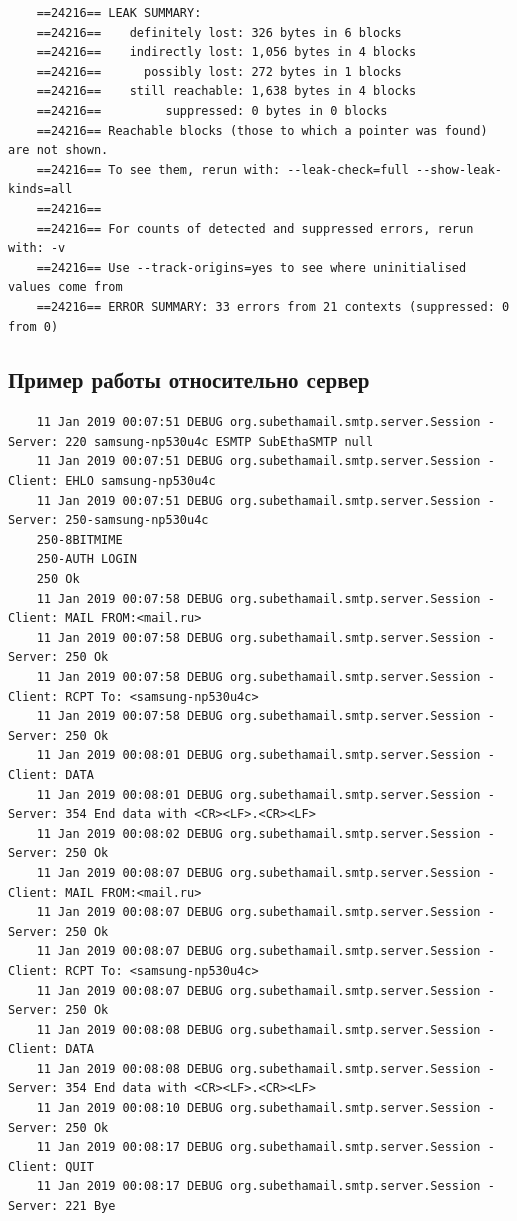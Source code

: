 \documentclass[a4paper,12pt]{report}
\begin{document}
\begin{verbatim}
    ==24216== LEAK SUMMARY:
    ==24216==    definitely lost: 326 bytes in 6 blocks
    ==24216==    indirectly lost: 1,056 bytes in 4 blocks
    ==24216==      possibly lost: 272 bytes in 1 blocks
    ==24216==    still reachable: 1,638 bytes in 4 blocks
    ==24216==         suppressed: 0 bytes in 0 blocks
    ==24216== Reachable blocks (those to which a pointer was found) are not shown.
    ==24216== To see them, rerun with: --leak-check=full --show-leak-kinds=all
    ==24216== 
    ==24216== For counts of detected and suppressed errors, rerun with: -v
    ==24216== Use --track-origins=yes to see where uninitialised values come from
    ==24216== ERROR SUMMARY: 33 errors from 21 contexts (suppressed: 0 from 0)
\end{verbatim}

\subsection{Пример работы относительно сервер}

\begin{verbatim}
    11 Jan 2019 00:07:51 DEBUG org.subethamail.smtp.server.Session - Server: 220 samsung-np530u4c ESMTP SubEthaSMTP null
    11 Jan 2019 00:07:51 DEBUG org.subethamail.smtp.server.Session - Client: EHLO samsung-np530u4c
    11 Jan 2019 00:07:51 DEBUG org.subethamail.smtp.server.Session - Server: 250-samsung-np530u4c
    250-8BITMIME
    250-AUTH LOGIN
    250 Ok
    11 Jan 2019 00:07:58 DEBUG org.subethamail.smtp.server.Session - Client: MAIL FROM:<mail.ru>
    11 Jan 2019 00:07:58 DEBUG org.subethamail.smtp.server.Session - Server: 250 Ok
    11 Jan 2019 00:07:58 DEBUG org.subethamail.smtp.server.Session - Client: RCPT To: <samsung-np530u4c>
    11 Jan 2019 00:07:58 DEBUG org.subethamail.smtp.server.Session - Server: 250 Ok
    11 Jan 2019 00:08:01 DEBUG org.subethamail.smtp.server.Session - Client: DATA
    11 Jan 2019 00:08:01 DEBUG org.subethamail.smtp.server.Session - Server: 354 End data with <CR><LF>.<CR><LF>
    11 Jan 2019 00:08:02 DEBUG org.subethamail.smtp.server.Session - Server: 250 Ok
    11 Jan 2019 00:08:07 DEBUG org.subethamail.smtp.server.Session - Client: MAIL FROM:<mail.ru>
    11 Jan 2019 00:08:07 DEBUG org.subethamail.smtp.server.Session - Server: 250 Ok
    11 Jan 2019 00:08:07 DEBUG org.subethamail.smtp.server.Session - Client: RCPT To: <samsung-np530u4c>
    11 Jan 2019 00:08:07 DEBUG org.subethamail.smtp.server.Session - Server: 250 Ok
    11 Jan 2019 00:08:08 DEBUG org.subethamail.smtp.server.Session - Client: DATA
    11 Jan 2019 00:08:08 DEBUG org.subethamail.smtp.server.Session - Server: 354 End data with <CR><LF>.<CR><LF>
    11 Jan 2019 00:08:10 DEBUG org.subethamail.smtp.server.Session - Server: 250 Ok
    11 Jan 2019 00:08:17 DEBUG org.subethamail.smtp.server.Session - Client: QUIT
    11 Jan 2019 00:08:17 DEBUG org.subethamail.smtp.server.Session - Server: 221 Bye
\end{verbatim}
\end{document}
